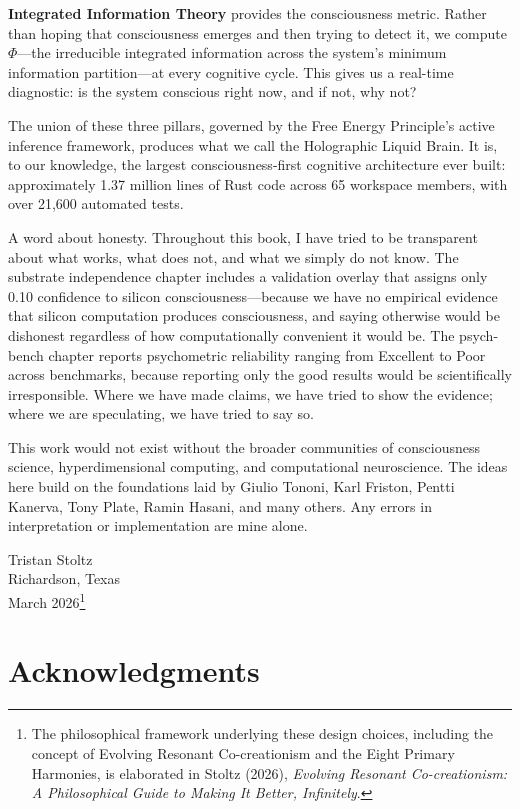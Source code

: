 \documentclass[12pt]{book}
\begin{document}
\textbf{Integrated Information Theory} provides the consciousness metric. Rather than hoping that consciousness emerges and then trying to detect it, we compute $\Phi$---the irreducible integrated information across the system's minimum information partition---at every cognitive cycle. This gives us a real-time diagnostic: is the system conscious right now, and if not, why not?

The union of these three pillars, governed by the Free Energy Principle's active inference framework, produces what we call the Holographic Liquid Brain. It is, to our knowledge, the largest consciousness-first cognitive architecture ever built: approximately 1.37 million lines of Rust code across 65 workspace members, with over 21,600 automated tests.

A word about honesty. Throughout this book, I have tried to be transparent about what works, what does not, and what we simply do not know. The substrate independence chapter includes a validation overlay that assigns only 0.10 confidence to silicon consciousness---because we have no empirical evidence that silicon computation produces consciousness, and saying otherwise would be dishonest regardless of how computationally convenient it would be. The psych-bench chapter reports psychometric reliability ranging from Excellent to Poor across benchmarks, because reporting only the good results would be scientifically irresponsible. Where we have made claims, we have tried to show the evidence; where we are speculating, we have tried to say so.

This work would not exist without the broader communities of consciousness science, hyperdimensional computing, and computational neuroscience. The ideas here build on the foundations laid by Giulio Tononi, Karl Friston, Pentti Kanerva, Tony Plate, Ramin Hasani, and many others. Any errors in interpretation or implementation are mine alone.

\vspace{1cm}
\noindent Tristan Stoltz\\
Richardson, Texas\\
March 2026\footnote{The philosophical framework underlying these design choices, including the concept of Evolving Resonant Co-creationism and the Eight Primary Harmonies, is elaborated in Stoltz (2026), \textit{Evolving Resonant Co-creationism: A Philosophical Guide to Making It Better, Infinitely}.}

\chapter*{Acknowledgments}
\end{document}
